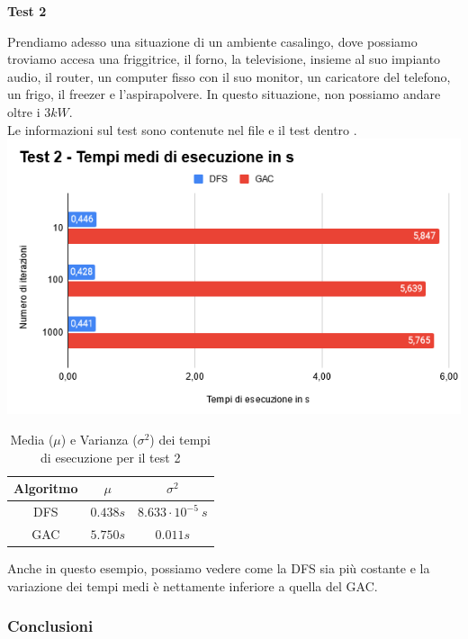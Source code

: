 \documentclass[12pt, letterpaper]{article}
\begin{document}
\noindent \textbf{Test 2}

\noindent Prendiamo adesso una situazione di un ambiente casalingo, dove possiamo troviamo accesa una
friggitrice, il forno, la televisione, insieme al suo impianto audio, il router, un computer
fisso con il suo monitor, un caricatore del telefono, un frigo, il freezer e l'aspirapolvere.
In questo situazione, non possiamo andare oltre i $3kW$. \\

\noindent Le informazioni sul test sono contenute nel file  e il test dentro
. \\

\includegraphics[scale=0.8]{test-2-performance.png}


\begin{table}[h!]
      \centering
      \begin{tabular}{| c | c | c |}
            \hline
            Algoritmo & $\mu$    & $\sigma^2$                \\
            \hline
            DFS       & $0.438s$ & $8.633 \cdot 10^{-5} \ s$ \\
            GAC       & $5.750s$ & $0.011s$                  \\
            \hline
      \end{tabular}
      \caption{Media ($\mu$) e Varianza ($\sigma^2$) dei tempi di esecuzione per il test 2}
\end{table}

\noindent Anche in questo esempio, possiamo vedere come la DFS sia più costante e la variazione dei tempi
medi è nettamente inferiore a quella del GAC.

\subsubsection{Conclusioni}
\end{document}
